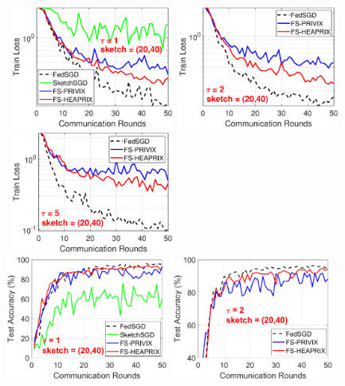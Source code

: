 \documentclass[twoside]{article}
\begin{document}
\begin{figure}[h]
	\begin{center}
		\mbox{			    \includegraphics[width=2.1in]{MNIST_figures/local1_sketch20_iid0_train_loss.eps} \hspace{-0.2in}
		\includegraphics[width=2.1in]{MNIST_figures/local2_sketch20_iid0_train_loss.eps} \hspace{-0.2in}
		\includegraphics[width=2.1in]{MNIST_figures/local5_sketch20_iid0_train_loss.eps}
		}
		\mbox{
		\includegraphics[width=2.1in]{MNIST_figures/local1_sketch20_iid0_test_acc.eps} \hspace{-0.2in}
		\includegraphics[width=2.1in]{MNIST_figures/local2_sketch20_iid0_test_acc.eps} \hspace{-0.2in}
}
\end{center}
\end{figure}
\end{document}
